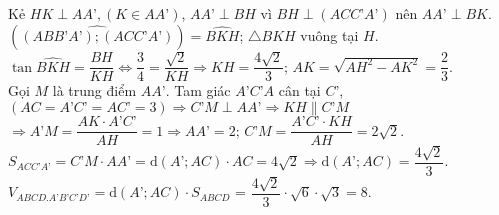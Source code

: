 \begin{ex}
{		Kẻ $HK\perp AA’,(K\in AA’)$, $AA’\perp BH$ vì $BH\perp(ACC’A’)$ nên $AA’\perp BK$.\\
		$\left(\widehat{(ABB’A’);(ACC’A’)}\right)=\widehat{BKH}$; $\triangle BKH$ vuông tại $H$.\\
		$\tan\widehat{BKH}=\dfrac{BH}{KH}\Leftrightarrow\dfrac{3}{4}=\dfrac{\sqrt{2}}{KH}\Rightarrow KH=\dfrac{4\sqrt{2}}{3}$; $AK=\sqrt{AH^2-AK^2}=\dfrac{2}{3}$.\\
		Gọi $M$ là trung điểm $AA’$. Tam giác $A’C’A$ cân tại $C’$, $\left(AC=A’C’=AC’=3\right)\Rightarrow C’M\perp AA’\Rightarrow KH\parallel C’M$ \\
		$ \Rightarrow A’M=\dfrac{AK\cdot A’C’}{AH}=1\Rightarrow AA’=2 $; $C’M=\dfrac{A’C’\cdot KH}{AH}=2\sqrt{2}$.\\
		$S_{ACC’A’}=C’M\cdot AA’=\mathrm{d}(A’;AC)\cdot AC=4\sqrt{2}\Rightarrow\mathrm{d}(A’;AC)=\dfrac{4\sqrt{2}}{3}$.\\
		$V_{ABCD.A’B’C’D’}=\mathrm{d}(A’;AC)\cdot S_{ABCD}$ = $\dfrac{4\sqrt{2}}{3}\cdot\sqrt{6}\cdot\sqrt{3}=8$.}
\end{ex}
